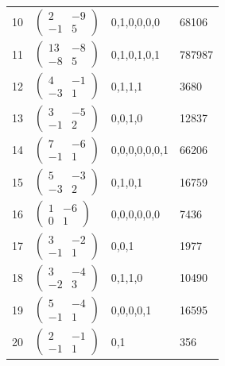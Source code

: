 \begin{center}
\begin{longtable}{rlll}
10 & $\left(\begin{smallmatrix}2&-9\\-1&5\end{smallmatrix}\right)$ & 0,1,0,0,0,0 & 68106\\
11 & $\left(\begin{smallmatrix}13&-8\\-8&5\end{smallmatrix}\right)$ & 0,1,0,1,0,1 & 787987\\
12 & $\left(\begin{smallmatrix}4&-1\\-3&1\end{smallmatrix}\right)$ & 0,1,1,1 & 3680\\
13 & $\left(\begin{smallmatrix}3&-5\\-1&2\end{smallmatrix}\right)$ & 0,0,1,0 & 12837\\
14 & $\left(\begin{smallmatrix}7&-6\\-1&1\end{smallmatrix}\right)$ & 0,0,0,0,0,0,1 & 66206\\
15 & $\left(\begin{smallmatrix}5&-3\\-3&2\end{smallmatrix}\right)$ & 0,1,0,1 & 16759\\
16 & $\left(\begin{smallmatrix}1&-6\\0&1\end{smallmatrix}\right)$ & 0,0,0,0,0,0 & 7436\\
17 & $\left(\begin{smallmatrix}3&-2\\-1&1\end{smallmatrix}\right)$ & 0,0,1 & 1977\\
18 & $\left(\begin{smallmatrix}3&-4\\-2&3\end{smallmatrix}\right)$ & 0,1,1,0 & 10490\\
19 & $\left(\begin{smallmatrix}5&-4\\-1&1\end{smallmatrix}\right)$ & 0,0,0,0,1 & 16595\\
20 & $\left(\begin{smallmatrix}2&-1\\-1&1\end{smallmatrix}\right)$ & 0,1 & 356\\

\end{longtable}
\end{center}
